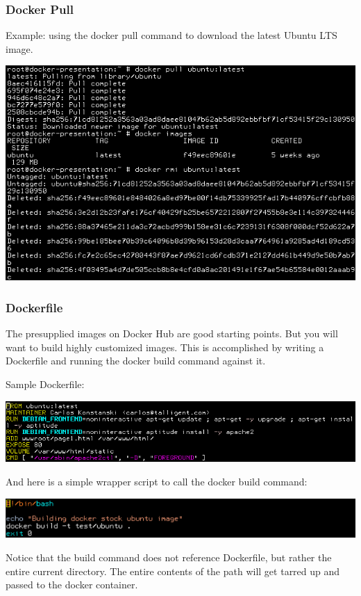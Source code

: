 \documentclass[helvetica,english,utf8,notitle,nologo]{beamer}
\begin{document}
\begin{frame}
  \frametitle{Docker Pull}

  Example: using the docker pull command to download the latest Ubuntu
  LTS image.

  \includegraphics[scale=0.48]{image_1}
\end{frame}

\begin{frame}
  \frametitle{Dockerfile}

  The presupplied images on Docker Hub are good starting points. But
  you will want to build highly customized images. This is
  accomplished by writing a Dockerfile and running the docker build
  command against it.

  Sample Dockerfile:

  \includegraphics[scale=0.44]{image_3}

  And here is a simple wrapper script to call the docker build command:

  \includegraphics[scale=0.48]{image_4}

  Notice that the build command does not reference Dockerfile, but
  rather the entire current directory. The entire contents of the path
  will get tarred up and passed to the docker container.
\end{frame}
\end{document}
